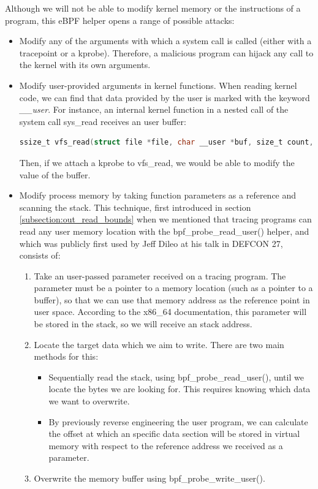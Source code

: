 \documentclass[12pt]{report} %
\begin{document}
Although we will not be able to modify kernel memory or the instructions of a program, this eBPF helper opens a range of possible attacks:
\begin{itemize}
\item Modify any of the arguments with which a system call is called (either with a tracepoint or a kprobe). Therefore, a malicious program can hijack any call to the kernel with its own arguments.
\item Modify user-provided arguments in kernel functions. When reading kernel code, we can find that data provided by the user is marked with the keyword \textit{\_\_user}. For instance, an internal kernel function in a nested call of the system call sys\_read receives an user buffer:
\begin{lstlisting}[language=C, caption={Definition of kernel function vfs\_read. \cite{code_vfs_read}}, label={code:vfs_read}]
ssize_t vfs_read(struct file *file, char __user *buf, size_t count, loff_t *pos)
\end{lstlisting}
Then, if we attach a kprobe to vfs\_read, we would be able to modify the value of the buffer.
\item Modify process memory by taking function parameters as a reference and scanning the stack. This technique, first introduced in section \ref{subsection:out_read_bounds} when we mentioned that tracing programs can read any user memory location with the bpf\_probe\_read\_user() helper, and which was publicly first used by Jeff Dileo at his talk in DEFCON 27\cite{evil_ebpf_p6974}, consists of:
\begin{enumerate}
\item Take an user-passed parameter received on a tracing program. The parameter must be a pointer to a memory location (such as a pointer to a buffer), so that we can use that memory address as the reference point in user space. According to the x86\_64 documentation, this parameter will be stored in the stack\cite{8664_params_abi_p1922}, so we will receive an stack address.
\item Locate the target data which we aim to write. There are two main methods for this:
\begin{itemize}
	\item Sequentially read the stack, using bpf\_probe\_read\_user(), until we locate the bytes we are looking for. This requires knowing which data we want to overwrite.
	\item By previously reverse engineering the user program, we can calculate the offset at which an specific data section will be stored in virtual memory with respect to the reference address we received as a parameter.
\end{itemize}
\item Overwrite the memory buffer using bpf\_probe\_write\_user().
\end{enumerate}
\end{itemize}
\end{document}
